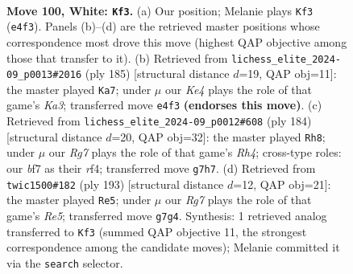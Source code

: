 \documentclass[11pt]{article}
\begin{document}
\clearpage

\begin{figure}[p]\centering
\begin{subfigure}{0.46\textwidth}\centering
\resizebox{\linewidth}{!}{%
\newchessgame
\chessboard[
  setfen={1r6/1k3bR1/5R2/8/4K3/8/8/8 w - - 2 100},
  showmover=false,
  pgfstyle=straightmove, color=movearrow, markmove={e4-f3}
]}
\caption{}
\end{subfigure}\hfill
\begin{subfigure}{0.46\textwidth}\centering
\resizebox{\linewidth}{!}{%
\newchessgame
\chessboard[
  setfen={8/2r5/kR6/2B5/2K5/8/8/8 b - - 73 93},
  showmover=false,
  pgfstyle=straightmove, color=movearrow, markmove={a6-a7}
]}
\caption{}
\end{subfigure}
\\[4pt]
\begin{subfigure}{0.46\textwidth}\centering
\resizebox{\linewidth}{!}{%
\newchessgame
\chessboard[
  setfen={8/8/2K5/8/4kr1R/8/8/8 w - - 72 93},
  showmover=false,
  pgfstyle=straightmove, color=movearrow, markmove={h4-h8}
]}
\caption{}
\end{subfigure}\hfill
\begin{subfigure}{0.46\textwidth}\centering
\resizebox{\linewidth}{!}{%
\newchessgame
\chessboard[
  setfen={5R2/4K3/4B3/6k1/4r3/8/8/8 b - - 52 97},
  showmover=false,
  pgfstyle=straightmove, color=movearrow, markmove={e4-e5}
]}
\caption{}
\end{subfigure}
\caption{\textbf{Move 100, White: \texttt{Kf3}.} (a) Our position; Melanie plays \texttt{Kf3} (\texttt{e4f3}). Panels (b)--(d) are the retrieved master positions whose correspondence most drove this move (highest QAP objective among those that transfer to it). (b) Retrieved from \texttt{lichess\_elite\_2024-09\_p0013\#2016} (ply 185) [structural distance $d$=19, QAP obj=11]: the master played \texttt{Ka7}; under $\mu$ our \emph{Ke4} plays the role of that game's \emph{Ka3}; transferred move \texttt{e4f3} \textbf{(endorses this move)}. (c) Retrieved from \texttt{lichess\_elite\_2024-09\_p0012\#608} (ply 184) [structural distance $d$=20, QAP obj=32]: the master played \texttt{Rh8}; under $\mu$ our \emph{Rg7} plays the role of that game's \emph{Rh4}; cross-type roles: our \emph{b}f7 as their \emph{r}f4; transferred move \texttt{g7h7}. (d) Retrieved from \texttt{twic1500\#182} (ply 193) [structural distance $d$=12, QAP obj=21]: the master played \texttt{Re5}; under $\mu$ our \emph{Rg7} plays the role of that game's \emph{Re5}; transferred move \texttt{g7g4}. Synthesis: 1 retrieved analog transferred to \texttt{Kf3} (summed QAP objective 11, the strongest correspondence among the candidate moves); Melanie committed it via the \texttt{search} selector.}
\label{fig:thought-m198}
\end{figure}
\end{document}
